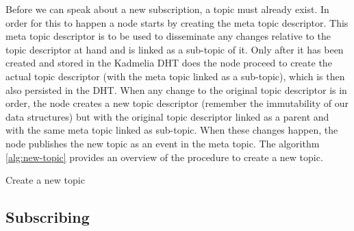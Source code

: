 Before we can speak about a new subscription, a topic must already exist. In
order for this to happen a node starts by creating the meta topic descriptor.
This meta topic descriptor is to be used to disseminate any changes relative to
the topic descriptor at hand and is linked as a sub-topic of it. Only after it
has been created and stored in the Kadmelia DHT does the node proceed to create
the actual topic descriptor (with the meta topic linked as a sub-topic), which
is then also persisted in the DHT. When any change to the original topic
descriptor is in order, the node creates a new topic descriptor (remember the
immutability of our data structures) but with the original topic descriptor
linked as a parent and with the same meta topic linked as sub-topic. When these
changes happen,  the node publishes the new topic as an event in the meta
topic.  The algorithm \ref{alg:new-topic} provides an overview of the procedure
to create a new topic.


\vspace{8pt}
\begin{algorithm}[H]
  \SetAlgoLined
  \caption{Create a new topic}
	\label{alg:new-topic}
\end{algorithm}
\vspace{8pt}

\subsection{Subscribing}\label{subsec:subscribing}

